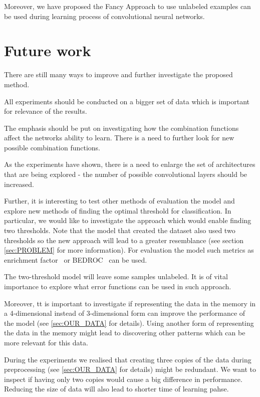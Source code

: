 \documentclass[a4paper,10pt]{report}
\begin{document}
    Moreover, we have proposed the Fancy Approach to use unlabeled examples can be used during learning process of convolutional neural networks. 
  
    \section{Future work}
      There are still many ways to improve and further investigate the proposed method.
      
      All experiments should be conducted on a bigger set of data which is important for relevance of the results.
      
      The emphasis should be put on investigating how the combination functions affect the networks ability to learn. There is a need to further look for new possible combination functions.
      
      As the experiments have shown, there is a need to enlarge the set of architectures that are being explored - the number of possible convolutional layers should be increased.
      
      Further, it is interesting to test other methods of evaluation the model and explore new methods of finding the optimal threshold for classification. In particular, we would like to investigate the approach which would enable finding two thresholds. Note that the model that created the dataset also used two thresholds so the new approach will lead to a greater resemblance (see section \ref{sec:PROBLEM} for more information). For evaluation the model such metrics as enrichment factor~\cite{ROC_EF, EF_BEDROC} or BEDROC~\cite{EF_BEDROC} can be used.
      
      The two-threshold model will leave some samples unlabeled. It is of vital importance to explore what error functions can be used in such approach.

      Moreover, tt is important to investigate if representing the data in the memory in a 4-dimensional instead of 3-dimensional form can improve the performance of the model (see \ref{sec:OUR_DATA} for details). Using another form of representing the data in the memory might lead to discovering other patterns which can be more relevant for this data.
      
      During the experiments we realised that creating three copies of the data during preprocessing (see \ref{sec:OUR_DATA} for details) might be redundant. We want to inspect if having only two copies would cause a big difference in performance. Reducing the size of data will also lead to shorter time of learning pahse.
      
\end{document}
